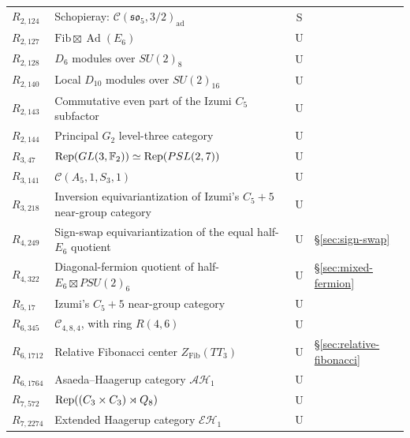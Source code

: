 \begin{longtable}{@{}lp{8.0cm}cl@{}}
$R_{2,124}$ & Schopieray: $\mathcal C(\mathfrak{so}_5,3/2)_{\mathrm{ad}}$ & S & \cite{SchNonPU}\\
$R_{2,127}$ & $\mathrm{Fib}\boxtimes\operatorname{Ad}(E_6)$ & U & \cite{KO}\\
$R_{2,128}$ & $D_6$ modules over $SU(2)_8$ & U & \cite{KO}\\
$R_{2,140}$ & Local $D_{10}$ modules over $SU(2)_{16}$ & U & \cite{KO}\\
$R_{2,143}$ & Commutative even part of the Izumi $C_5$ subfactor & U & \cite{EG}\\
$R_{2,144}$ & Principal $G_2$ level-three category & U & \cite{QGsurvey}\\
\addlinespace
$R_{3,47}$ & $\operatorname{Rep}(GL(3,\mathbb F_2))\simeq\operatorname{Rep}(PSL(2,7))$ & U & \cite{Integral}\\
$R_{3,141}$ & $\mathcal C(A_5,1,S_3,1)$ & U & \cite{Integral}\\
$R_{3,218}$ & Inversion equivariantization of Izumi's $C_5+5$ near-group category & U & \cite{Izumi}\\
\addlinespace
$R_{4,249}$ & Sign-swap equivariantization of the equal half-$E_6$ quotient & U & \S\ref{sec:sign-swap}\\
$R_{4,322}$ & Diagonal-fermion quotient of half-$E_6\boxtimes PSU(2)_6$ & U & \S\ref{sec:mixed-fermion}\\
\addlinespace
$R_{5,17}$ & Izumi's $C_5+5$ near-group category & U & \cite{Izumi}\\
\addlinespace
$R_{6,345}$ & $\mathcal C_{4,8,4}$, with ring $R(4,6)$ & U & \cite{MY}\\
$R_{6,1712}$ & Relative Fibonacci center $Z_{\mathrm{Fib}}(TT_3)$ & U & \S\ref{sec:relative-fibonacci}\\
$R_{6,1764}$ & Asaeda--Haagerup category $\mathcal{AH}_1$ & U & \cite{GSAH}\\
\addlinespace
$R_{7,572}$ & $\operatorname{Rep}((C_3\times C_3)\rtimes Q_8)$ & U & \cite{EGNO}\\
$R_{7,2274}$ & Extended Haagerup category $\mathcal{EH}_1$ & U & \cite{BMPS,BPEH}\\
\end{longtable}
\endgroup
